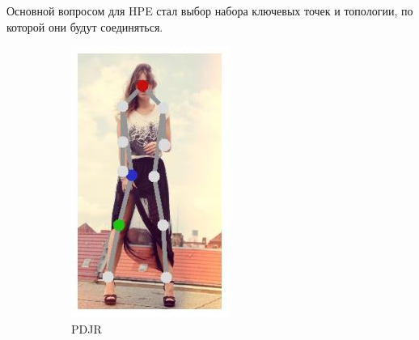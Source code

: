 Основной вопросом для HPE стал выбор набора ключевых точек и топологии, по которой они будут соединяться.

\begin{figure}[h]
\centering
\begin{subfigure}[b]{.16\textwidth}
	\centering
	\includegraphics[width=\textwidth]{./images/tasks/regpose_topology.png}
	\caption{PDJR \cite{PDJR}}
\end{subfigure}
\begin{subfigure}[b]{.3\textwidth}
	\centering

\end{subfigure}
\end{figure}
